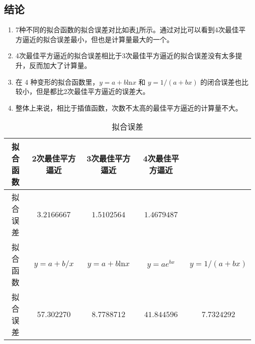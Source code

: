 \subsection{结论}

\begin{enumerate}[(1)]
    \item 7种不同的拟合函数的拟合误差对比如表\ref{tab:error}所示。通过对比可以看到4次最佳平方逼近的拟合误差最小，但也是计算量最大的一个。
    \item 4次最佳平方逼近的拟合误差相比于3次最佳平方逼近的拟合误差没有太多提升，反而加大了计算量。
    \item 在 4 种变形的拟合函数里，$y=a+b\mathrm{ln}x$ 和 $y={1}/(a+bx)$ 的闭合误差也比较小，但是都比2次最佳平方逼近的误差大。
    \item 整体上来说，相比于插值函数，次数不太高的最佳平方逼近的计算量不大。
\end{enumerate}

\begin{table}[ht]\centering
    \caption{拟合误差}
    \label{tab:error}
    \begin{tabular}{c|cccc}
        拟合函数 & 2次最佳平方逼近 & 3次最佳平方逼近 & 4次最佳平方逼近 & \\
        \hline
        拟合误差 & $3.2166667$ & $1.5102564$ & $1.4679487$ & \\
        \hline\hline
        拟合函数 & $y=a+{b}/{x}$ & $y=a+b\mathrm{ln}x$ & $y=ae^{bx}$ & $y={1}/(a+bx)$ \\
        \hline
        拟合误差 & $57.302270$ & $8.7788712$ & $41.844596$ & $7.7324292$
    \end{tabular}
\end{table}

